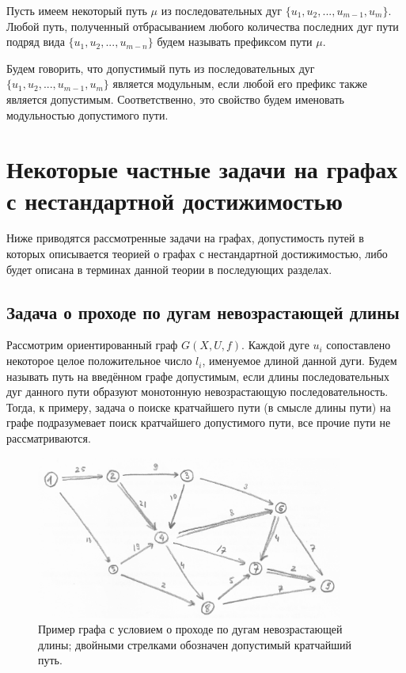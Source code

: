 \begin{definition}
	Пусть имеем некоторый путь $\mu$ из последовательных дуг $\{u_1, u_2, ... , u_{m-1}, u_m\}$. Любой путь, полученный отбрасыванием любого количества последних дуг пути подряд вида $\{u_1, u_2, ... , u_{m-n} \}$ будем называть префиксом пути $\mu$.
\end{definition}

\begin{definition}
	Будем говорить, что допустимый путь из последовательных дуг $\{u_1, u_2, ... , u_{m-1}, u_m\}$ является модульным, если любой его префикс также является допустимым. Соответственно, это свойство будем именовать модульностью допустимого пути. 
\end{definition}

\section{Некоторые частные задачи на графах с нестандартной достижимостью}

Ниже приводятся рассмотренные задачи на графах, допустимость путей в которых описывается теорией о графах с нестандартной достижимостью, либо будет описана в терминах данной теории в последующих разделах. 

\subsection{Задача о проходе по дугам невозрастающей длины}

Рассмотрим ориентированный граф $G(X,U,f)$. Каждой дуге $u_i$ сопоставлено некоторое целое положительное число $l_i$, именуемое длиной данной дуги. Будем называть путь на введённом графе допустимым, если длины последовательных дуг данного пути образуют монотонную невозрастающую последовательность. Тогда, к примеру, задача о поиске кратчайшего пути (в смысле длины пути) на графе подразумевает поиск кратчайшего допустимого пути, все прочие пути не рассматриваются. 

\begin{figure}
	\centering	
	{\includegraphics[width=0.9\textwidth]{img/1.png}}
	{Пример графа с условием о проходе по дугам невозрастающей длины; двойными стрелками обозначен допустимый кратчайший путь.}
	\label{fig:pic_1}
\end{figure}


